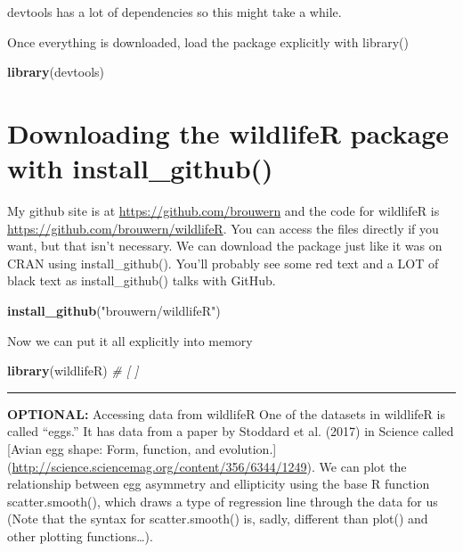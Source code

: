 \documentclass[]{book}
\newenvironment{Shaded}{\begin{snugshade}}{\end{snugshade}}
\newcommand{\KeywordTok}[1]{\textcolor[rgb]{0.13,0.29,0.53}{\textbf{#1}}}
\newcommand{\StringTok}[1]{\textcolor[rgb]{0.31,0.60,0.02}{#1}}
\newcommand{\CommentTok}[1]{\textcolor[rgb]{0.56,0.35,0.01}{\textit{#1}}}
\newcommand{\NormalTok}[1]{#1}
\theoremstyle{definition}
\theoremstyle{definition}
\theoremstyle{definition}
\theoremstyle{remark}
\begin{document}
devtools has a lot of dependencies so this might take a while.

Once everything is downloaded, load the package explicitly with
library()

\begin{Shaded}
\begin{Highlighting}[]
\KeywordTok{library}\NormalTok{(devtools)}
\end{Highlighting}
\end{Shaded}

\section{\texorpdfstring{\protect\hyperlink{section-3}{} Downloading the
wildlifeR package with
install\_github()}{ Downloading the wildlifeR package with install\_github()}}\label{downloading-the-wildlifer-package-with-install_github}

My github site is at \url{https://github.com/brouwern} and the code for
wildlifeR is \url{https://github.com/brouwern/wildlifeR}. You can access
the files directly if you want, but that isn't necessary. We can
download the package just like it was on CRAN using install\_github().
You'll probably see some red text and a LOT of black text as
install\_github() talks with GitHub.

\begin{Shaded}
\begin{Highlighting}[]
\KeywordTok{install_github}\NormalTok{(}\StringTok{"brouwern/wildlifeR"}\NormalTok{)}
\end{Highlighting}
\end{Shaded}

Now we can put it all explicitly into memory

\begin{Shaded}
\begin{Highlighting}[]
\KeywordTok{library}\NormalTok{(wildlifeR) }\CommentTok{# [ ] }
\end{Highlighting}
\end{Shaded}

\begin{center}\rule{0.5\linewidth}{\linethickness}\end{center}

\textbf{OPTIONAL:} Accessing data from wildlifeR One of the datasets in
wildlifeR is called ``eggs.'' It has data from a paper by Stoddard et
al. (2017) in Science called {[}Avian egg shape: Form, function, and
evolution.{]}
(\url{http://science.sciencemag.org/content/356/6344/1249}). We can plot
the relationship between egg asymmetry and ellipticity using the base R
function scatter.smooth(), which draws a type of regression line through
the data for us (Note that the syntax for scatter.smooth() is, sadly,
different than plot() and other plotting functions\ldots{}).
\end{document}
